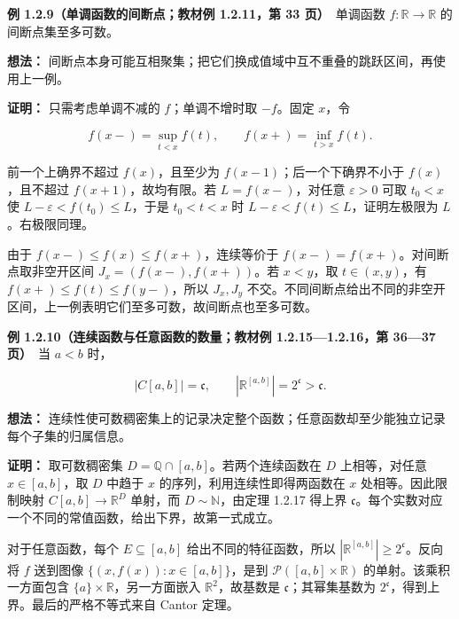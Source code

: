\documentclass[11pt,a4paper]{article}
\begin{document}
\textbf{例 1.2.9（单调函数的间断点；教材例 1.2.11，第 33 页）}　单调函数
\(f:\mathbb R\to\mathbb R\) 的间断点集至多可数。

\textbf{想法：}
间断点本身可能互相聚集；把它们换成值域中互不重叠的跳跃区间，再使用上一例。

\textbf{证明：} 只需考虑单调不减的 \(f\)；单调不增时取 \(-f\)。固定
\(x\)，令

\begin{equation*}
f(x-)=\sup_{t<x}f(t),\qquad f(x+)=\inf_{t>x}f(t).
\tag{1.2.22}
\end{equation*}

前一个上确界不超过 \(f(x)\)，且至少为 \(f(x-1)\)；后一个下确界不小于
\(f(x)\)，且不超过 \(f(x+1)\)，故均有限。若 \(L=f(x-)\)，对任意
\(\varepsilon>0\) 可取 \(t_0<x\) 使 \(L-\varepsilon<f(t_0)\le L\)，于是
\(t_0<t<x\) 时 \(L-\varepsilon<f(t)\le L\)，证明左极限为
\(L\)。右极限同理。

由于 \(f(x-)\le f(x)\le f(x+)\)，连续等价于
\(f(x-)=f(x+)\)。对间断点取非空开区间 \(J_x=(f(x-),f(x+))\)。若
\(x<y\)，取 \(t\in(x,y)\)，有 \(f(x+)\le f(t)\le f(y-)\)，所以
\(J_x,J_y\)
不交。不同间断点给出不同的非空开区间，上一例表明它们至多可数，故间断点也至多可数。

\textbf{例 1.2.10（连续函数与任意函数的数量；教材例 1.2.15---1.2.16，第
36---37 页）}　当 \(a<b\) 时，

\begin{equation*}
|C[a,b]|=\mathfrak c,
\qquad |\mathbb R^{[a,b]}|=2^{\mathfrak c}>\mathfrak c.
\tag{1.2.23}
\end{equation*}

\textbf{想法：}
连续性使可数稠密集上的记录决定整个函数；任意函数却至少能独立记录每个子集的归属信息。

\textbf{证明：} 取可数稠密集 \(D=\mathbb Q\cap[a,b]\)。若两个连续函数在
\(D\) 上相等，对任意 \(x\in[a,b]\)，取 \(D\) 中趋于 \(x\)
的序列，利用连续性即得两函数在 \(x\) 处相等。因此限制映射
\(C[a,b]\to\mathbb R^D\) 单射，而 \(D\sim\mathbb N\)，由定理 1.2.17
得上界
\(\mathfrak c\)。每个实数对应一个不同的常值函数，给出下界，故第一式成立。

对于任意函数，每个 \(E\subseteq[a,b]\) 给出不同的特征函数，所以
\(|\mathbb R^{[a,b]}|\ge2^{\mathfrak c}\)。反向将 \(f\) 送到图像
\(\{(x,f(x)):x\in[a,b]\}\)，是到 \(\mathcal P([a,b]\times\mathbb R)\)
的单射。该乘积一方面包含 \(\{a\}\times\mathbb R\)，另一方面嵌入
\(\mathbb R^2\)，故基数是 \(\mathfrak c\)；其幂集基数为
\(2^{\mathfrak c}\)，得到上界。最后的严格不等式来自 Cantor 定理。
\end{document}
